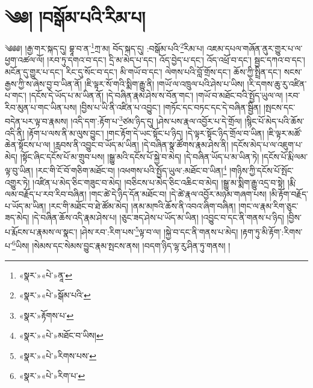 \chapter{༄༅། །བསྒོམ་པའི་རིམ་པ།}༄༅༅། །རྒྱ་གར་སྐད་དུ། བྷཱ་བ་ན་\footnote{«སྣར་»«པེ་»ནཱ་}ཀྲ་མ། བོད་སྐད་དུ། :བསྒོམ་པའི་\footnote{«སྣར་»«པེ་»སྒོམ་པའི་}རིམ་པ། འཇམ་དཔལ་གཞོན་ནུར་གྱུར་པ་ལ་ཕྱག་འཚལ་ལོ། །རབ་ཏུ་དགའ་བ་དང་། དྲི་མ་མེད་པ་དང་། འོད་བྱེད་པ་དང་། འོད་འཕྲོ་བ་དང་། སྦྱང་དཀའ་བ་དང་། མངོན་དུ་གྱུར་པ་དང་། རིང་དུ་སོང་བ་དང་། མི་གཡོ་བ་དང་། ལེགས་པའི་བློ་གྲོས་དང་། ཆོས་ཀྱི་སྤྲིན་དང་། སངས་རྒྱས་ཀྱི་ས་ཞེས་བྱ་བ་ཡིན་ནོ། །ཇི་ལྟར་སོ་གའི་སྨིག་རྒྱུ་ནི། །གཡོ་ལ་འཁྲུལ་པའི་ཤེས་པ་ཡིས། །རི་དགས་ཆུ་རུ་འཛིན་པ་གང་། །དངོས་དེ་ཡོད་པ་མ་ཡིན་ནོ། །དེ་བཞིན་རྣམ་ཤེས་ས་བོན་གང་། །གཡོ་བ་མཐོང་བའི་སྤྱོད་ཡུལ་ལ། །རབ་རིབ་མུན་པ་གང་ཡིན་པས། །བྱིས་པ་ཡི་ནི་འཛིན་པ་འབྱུང་། །གཏོང་དང་བཏང་དང་དེ་བཞིན་སྦྱིན། །སྤངས་དང་བདེན་པར་ལྟ་བ་རྣམས། །འདི་དག་:རྟོག་པ་\footnote{«སྣར་»རྟོགས་པ་}ཙམ་ཉིད་དུ། །ཤེས་པས་རྣལ་འབྱོར་པ་དེ་གྲོལ། །སྙིང་པོ་མེད་པའི་ཆོས་འདི་ནི། །རྟོག་པ་ལས་ནི་མ་ལུས་བྱུང་། །གང་རྟོག་དེ་ཡང་སྟོང་པ་ཉིད། །དེ་ལྟར་སྟོང་ཉིད་གྲོལ་བ་ཡིན། །ཇི་ལྟར་མཚོ་ཆེན་སྟོངས་པ་ལ། །རླབས་ནི་འབྱུང་བ་ཡོད་མ་ཡིན། །དེ་བཞིན་སྣ་ཚོགས་རྣམ་ཤེས་ནི། །དངོས་མེད་པ་ལ་འཇུག་པ་མེད། །སྟོང་ཞིང་དངོས་པོ་མ་གྲུབ་པས། །སྒྱུ་མའི་དངོས་པོ་སྐྱེ་བ་མེད། །དེ་བཞིན་ཡོད་པ་མ་ཡིན་ཏེ། །དངོས་པོ་རྨི་ལམ་ལྟ་བུ་ཡིན། །རང་གི་ངོ་བོ་གཅིག་མཐོང་བ། །འཕགས་པའི་སྤྱོད་ཡུལ་:མཐོང་བ་ཡིན།\footnote{«སྣར་»«པེ་»མཐོང་བ་ཡིས།} །གཉིས་ཀྱི་དངོས་པོ་སྤོང་འགྱུར་ཏེ། །འཛིན་པ་མེད་ཅིང་གཟུང་བ་མེད། །བཅིངས་པ་མེད་ཅིང་འཆིང་བ་མེད། །སྒྱུ་མ་སྨིག་རྒྱུ་འདྲ་བ་སྟེ། །རྨི་ལམ་བརྗོད་པ་རབ་རིབ་བཞིན། །གང་ཚེ་དེ་ཉིད་དོན་མཐོང་བ། །དེ་ཚེ་རྣལ་འབྱོར་མཉམ་གཞག་པས། །མི་རྟོག་བརྗོད་པ་ཡོད་མ་ཡིན། །རང་གི་མཐོང་བ་ཐེ་ཚོམ་མེད། །ནམ་མཁའི་ཆོས་ནི་འབའ་ཞིག་བཞིན། །གང་ལ་རྣམ་རིག་ཅུང་ཟད་མེད། །དེ་བཞིན་ཆོས་འདི་རྣམ་ཤེས་པ། །ཅུང་ཟད་ཤེས་པ་ཡོད་མ་ཡིན། །འབྱུང་བ་དང་ནི་གནས་པ་ཉིད། །བྱིས་པ་རྨོངས་པ་རྣམས་ལ་སྣང་། །ཤེས་རབ་:རིག་པས་\footnote{«སྣར་»«པེ་»རིགས་པས་}ལྟ་བ་ལ། །སྐྱེ་བ་དང་ནི་གནས་པ་མེད། །རྟག་ཏུ་མི་རྟོག་:རིགས་པ་\footnote{«སྣར་»«པེ་»རིག་པ་}ཡིས། །སེམས་དང་སེམས་བྱུང་རྣམ་སྤངས་ནས། །བདག་ཉིད་ལྷ་རུ་ཤིན་ཏུ་གནས། །
